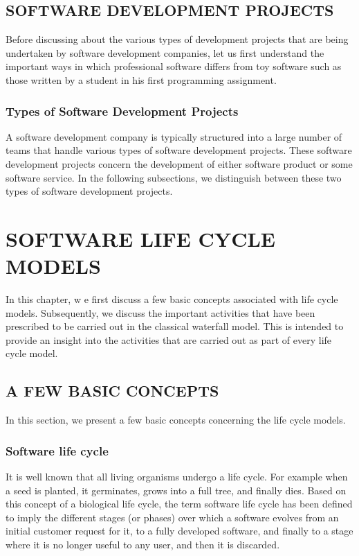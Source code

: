 \documentclass[12pt]{article}
\begin{document}
\subsection{SOFTWARE DEVELOPMENT PROJECTS}
Before discussing about the various types of development projects that
are being undertaken by software development companies, let us first
understand the important ways in which professional software differs
from toy software such as those written by a student in his first
programming assignment.
\subsubsection{Types of Software Development Projects}
A software development company is typically structured into a large
number of teams that handle various types of software development
projects. These software development projects concern the
development of either software product or some software service. In
the following subsections, we distinguish between these two types of
software development projects.
\pagebreak

\section{SOFTWARE LIFE CYCLE MODELS}
In this chapter, w e first discuss a few basic concepts associated with life
cycle models. Subsequently, we discuss the important activities that have
been prescribed to be carried out in the classical waterfall model. This is
intended to provide an insight into the activities that are carried out as part
of every life cycle model.
\subsection{A FEW BASIC CONCEPTS}
In this section, we present a few basic concepts concerning the life cycle
models.
\subsubsection{Software life cycle}
It is well known that all living organisms undergo a life cycle. For
example when a seed is planted, it germinates, grows into a full tree,
and finally dies. Based on this concept of a biological life cycle, the term
software life cycle has been defined to imply the different stages (or
phases) over which a software evolves from an initial customer request
for it, to a fully developed software, and finally to a stage where it is no
longer useful to any user, and then it is discarded.
\end{document}
